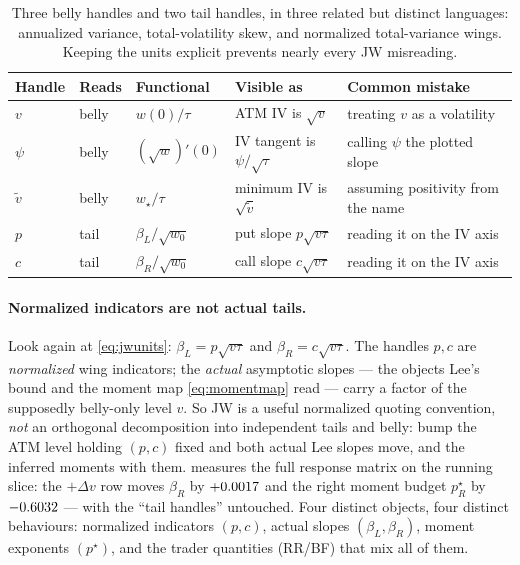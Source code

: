\documentclass[11pt]{article}
\newcommand{\wmin}{w_\star}         %
\newcommand{\vmin}{\widetilde v}    %
\newcommand{\betL}{\beta_L}
\newcommand{\betR}{\beta_R}
\begin{document}
\begin{table}[H]
\centering
\small
\setlength{\tabcolsep}{5pt}
\begin{tabular}{@{}p{}p{}p{}p{}p{}@{}}
\toprule
Handle & Reads & Functional & Visible as & Common mistake\\
\midrule
$v$ & belly & $w(0)/\tau$ & ATM IV is $\sqrt v$ & treating $v$ as a volatility\\
$\psi$ & belly & $(\sqrt w)'(0)$ & IV tangent is $\psi/\sqrt\tau$ & calling $\psi$ the plotted slope\\
$\vmin$ & belly & $\wmin/\tau$ & minimum IV is $\sqrt{\vmin}$ & assuming positivity from the name\\
$p$ & tail & $\betL/\sqrt{w_0}$ & put slope $p\sqrt{v\tau}$ & reading it on the IV axis\\
$c$ & tail & $\betR/\sqrt{w_0}$ & call slope $c\sqrt{v\tau}$ & reading it on the IV axis\\
\bottomrule
\end{tabular}
\caption{Three belly handles and two tail handles, in three related but distinct
languages: annualized variance, total-volatility skew, and normalized
total-variance wings.  Keeping the units explicit prevents nearly every JW
misreading.}
\label{tab:handles}
\end{table}

\paragraph{Normalized indicators are not actual tails.}
Look again at \eqref{eq:jwunits}: $\betL=p\sqrt{v\tau}$ and
$\betR=c\sqrt{v\tau}$.  The handles $p,c$ are \emph{normalized} wing
indicators; the \emph{actual} asymptotic slopes --- the objects Lee's bound
and the moment map \eqref{eq:momentmap} read --- carry a factor of the
supposedly belly-only level $v$.  So JW is a useful normalized quoting
convention, \emph{not} an orthogonal decomposition into independent tails and
belly: bump the ATM level holding $(p,c)$ fixed and both actual Lee slopes
move, and the inferred moments with them.   measures the full
response matrix on the running slice: the $+\Delta v$ row moves $\betR$ by
$+0.0017$ and the right moment budget $p^\star_R$ by
$-0.6032$ --- with the ``tail handles'' untouched.  Four distinct
objects, four distinct behaviours: normalized indicators $(p,c)$, actual
slopes $(\betL,\betR)$, moment exponents $(p^\star)$, and the trader
quantities (RR/BF) that mix all of them.
\end{document}
